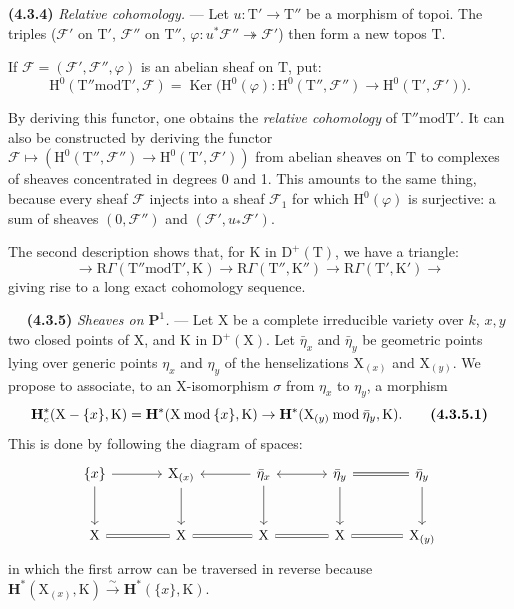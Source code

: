 \documentclass[11pt,leqno]{article}
\newcommand{\Page}[1]{\ifvmode\noindent\else\unskip\ \fi{\footnotesize\textcolor{gray}{[p.\,#1]}}\ \ignorespaces}
\begin{document}
\textbf{(4.3.4)} \textit{Relative cohomology.} — Let \(u:\mathrm{T}'\to\mathrm{T}''\) be a morphism of topoi. The triples (\(\mathscr{F}'\) on \(\mathrm{T}'\), \(\mathscr{F}''\) on \(\mathrm{T}''\), \(\varphi:u^*\mathscr{F}''\twoheadrightarrow\mathscr{F}'\)) then form a new topos \(\mathrm{T}\).

If \(\mathscr{F}=(\mathscr{F}',\mathscr{F}'',\varphi)\) is an abelian sheaf on \(\mathrm{T}\), put:
\[
\mathrm{H}^0(\mathrm{T}''\mathbin{\mathrm{mod}}\mathrm{T}',\mathscr{F})
=
\operatorname{Ker}
\bigl(\mathrm{H}^0(\varphi):
\mathrm{H}^0(\mathrm{T}'',\mathscr{F}'')
\to\mathrm{H}^0(\mathrm{T}',\mathscr{F}')\bigr).
\]

By deriving this functor, one obtains the \textit{relative cohomology} of \(\mathrm{T}''\mathbin{\mathrm{mod}}\mathrm{T}'\). It can also be constructed by deriving the functor \(\mathscr{F}\mapsto(\mathrm{H}^0(\mathrm{T}'',\mathscr{F}'')\to\mathrm{H}^0(\mathrm{T}',\mathscr{F}'))\) from abelian sheaves on \(\mathrm{T}\) to complexes of sheaves concentrated in degrees 0 and 1. This amounts to the same thing, because every sheaf \(\mathscr{F}\) injects into a sheaf \(\mathscr{F}_1\) for which \(\mathrm{H}^0(\varphi)\) is surjective: a sum of sheaves \((0,\mathscr{F}'')\) and \((\mathscr{F}',u_*\mathscr{F}')\).

The second description shows that, for \(\mathrm{K}\) in \(\mathrm{D}^+(\mathrm{T})\), we have a triangle:
\[
\to\mathrm{R}\Gamma(\mathrm{T}''\mathbin{\mathrm{mod}}\mathrm{T}',\mathrm{K})
\to\mathrm{R}\Gamma(\mathrm{T}'',\mathrm{K}'')
\to\mathrm{R}\Gamma(\mathrm{T}',\mathrm{K}')
\to
\]
giving rise to a long exact cohomology sequence.

\Page{224}
\textbf{(4.3.5)} \textit{Sheaves on \(\mathbf{P}^1\).} — Let \(\mathrm{X}\) be a complete irreducible variety over \(k\), \(x,y\) two closed points of \(\mathrm{X}\), and \(\mathrm{K}\) in \(\mathrm{D}^+(\mathrm{X})\). Let \(\bar\eta_x\) and \(\bar\eta_y\) be geometric points lying over generic points \(\eta_x\) and \(\eta_y\) of the henselizations \(\mathrm{X}_{(x)}\) and \(\mathrm{X}_{(y)}\). We propose to associate, to an \(\mathrm{X}\)-isomorphism \(\sigma\) from \(\eta_x\) to \(\eta_y\), a morphism
\[
\mathbf{H}_c^*(\mathrm{X}-\{x\},\mathrm{K})
=
\mathbf{H}^*(\mathrm{X}\mathbin{\mathrm{mod}}\{x\},\mathrm{K})
\to
\mathbf{H}^*(\mathrm{X}_{(y)}\mathbin{\mathrm{mod}}\bar\eta_y,\mathrm{K}).
\tag*{\textbf{(4.3.5.1)}}
\]
This is done by following the diagram of spaces:
\[
\begin{tikzcd}[column sep=large,row sep=large]
\{x\} \arrow[r] \arrow[d]
  & \mathrm{X}_{(x)} \arrow[d]
  & \bar\eta_x \arrow[l] \arrow[r,leftrightarrow] \arrow[d]
  & \bar\eta_y \arrow[r,equal] \arrow[d]
  & \bar\eta_y \arrow[d] \\
\mathrm{X} \arrow[r,equal]
  & \mathrm{X} \arrow[r,equal]
  & \mathrm{X} \arrow[r,equal]
  & \mathrm{X} \arrow[r,equal]
  & \mathrm{X}_{(y)}
\end{tikzcd}
\]
in which the first arrow can be traversed in reverse because \(\mathbf{H}^*(\mathrm{X}_{(x)},\mathrm{K})\xrightarrow{\sim}\mathbf{H}^*(\{x\},\mathrm{K})\).
\end{document}
